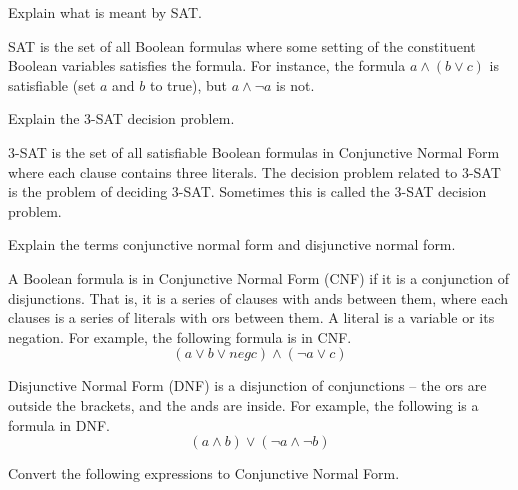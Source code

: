 \documentclass[a4paper, 12pt]{exam}
\begin{document}
\begin{questions}
\question
  Explain what is meant by SAT.
  \begin{solution}
    SAT is the set of all Boolean formulas where some setting of the constituent Boolean variables satisfies the formula.
    For instance, the formula $a \land (b \lor c)$ is satisfiable (set $a$ and $b$ to true), but $a \land \neg a$ is not.
  \end{solution}

\question
  Explain the 3-SAT decision problem.
  \begin{solution}
   3-SAT is the set of all satisfiable Boolean formulas in Conjunctive Normal Form where each clause contains three literals.
   The decision problem related to 3-SAT is the problem of deciding 3-SAT.
   Sometimes this is called the 3-SAT decision problem.
  \end{solution}

\question
  Explain the terms conjunctive normal form and disjunctive normal form.
  \begin{solution}
    A Boolean formula is in Conjunctive Normal Form (CNF) if it is a conjunction of disjunctions.
    That is, it is a series of clauses with ands between them, where each clauses is a series of literals with ors between them.
    A literal is a variable or its negation.
    For example, the following formula is in CNF.
      $$ (a \lor b \lor neg c) \land (\neg a \lor c) $$
    
    Disjunctive Normal Form (DNF) is a disjunction of conjunctions -- the ors are outside the brackets, and the ands are inside.
    For example, the following is a formula in DNF.
      $$ (a \land b) \lor (\neg a \land \neg b) $$
  \end{solution}


\question
  Convert the following expressions to Conjunctive Normal Form.
\end{questions}
\end{document}
